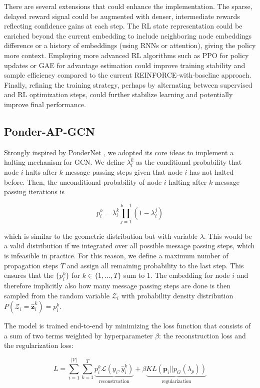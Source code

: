 \documentclass{gdl}
\begin{document}
There are several extensions that could enhance the implementation. The sparse, delayed reward signal could be augmented with denser, intermediate rewards reflecting confidence gains at each step. The RL state representation could be enriched beyond the current embedding to include neighboring node embeddings difference or a history of embeddings (using RNNs or attention), giving the policy more context. Employing more advanced RL algorithms such as PPO for policy updates or GAE for advantage estimation could improve training stability and sample efficiency compared to the current REINFORCE-with-baseline approach. Finally, refining the training strategy, perhaps by alternating between supervised and RL optimization steps, could further stabilize learning and potentially improve final performance.

\subsection{Ponder-AP-GCN}
Strongly inspired by PonderNet \cite{banino2021}, we adopted its core ideas to implement a halting mechanism for GCN. We define $\lambda_i^k$ as the conditional probability that node $i$ halts after $k$ message passing steps given that node $i$ has not halted before. Then, the unconditional probability of node $i$ halting after $k$ message passing iterations is

\begin{equation}
p_i^k = \lambda_i^k \prod_{j=1}^{k-1} (1-\lambda_i^j)
\end{equation}

\noindent which is similar to the geometric distribution but with variable $\lambda$. This would be a valid distribution if we integrated over all possible message passing steps, which is infeasible in practice. For this reason, we define a maximum number of propagation steps $T$ and assign all remaining probability to the last step. This ensures that the $\{p_i^k\}$ for $k\in \{1,...,T\}$ sum to 1. The embedding for node $i$ and therefore implicitly also how many message passing steps are done is then sampled from the random variable $\mathcal{Z}_i$ with probability density distribution $P(\mathcal{Z}_i=\hat{\mathbf{z}}_i^k) = p_i^k$.

The model is trained end-to-end by minimizing the loss function that consists of a sum of two terms weighted by hyperparameter $\beta$: the reconstruction loss and the regularization loss:

\begin{equation}
L = \sum_{i=1}^{\mathcal{|V|}} \sum_{k=1}^{T} \underbrace{p_i^k \mathcal{L}(y_i, \hat{y}_i^k)}_{\text{reconstruction}} + \beta \underbrace{KL(\mathbf{p}_i || p_G(\lambda_p))}_{\text{regularization}}
\label{eq:ponder-loss}
\end{equation}
\end{document}
